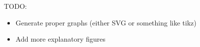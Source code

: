 \color{purple}
TODO:
\begin{itemize}
  \item Generate proper graphs (either SVG or something like tikz)
  \item Add more explanatory figures
\end{itemize}
